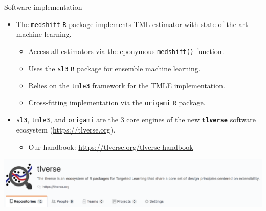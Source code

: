 \documentclass{beamer}
\begin{document}

\begin{frame}[c]{Software implementation}

\begin{center}
\begin{itemize}
  \itemsep2pt
  \item The \underline{\texttt{medshift} \texttt{R} package}
    \citep{hejazi2019medshift} implements TML estimator with state-of-the-art
    machine learning.
    \begin{itemize}
      \item Access all estimators via the eponymous \texttt{medshift()}
        function.
      \item Uses the \texttt{sl3} \texttt{R} package for ensemble machine
        learning.
      \item Relies on the \texttt{tmle3} framework for the TMLE implementation.
      \item Cross-fitting implementation via the \texttt{origami} \texttt{R}
        package.
    \end{itemize}
  \item \texttt{sl3}, \texttt{tmle3}, and \texttt{origami} are the 3 core
    engines of the new \textbf{\texttt{tlverse}} software ecosystem
    (\url{https://tlverse.org}).
    \begin{itemize}
      \item Our handbook: \url{https://tlverse.org/tlverse-handbook}
    \end{itemize}
\end{itemize}
\includegraphics[origin=c,scale=0.3]{tlverse}
\end{center}

\note{
}

\end{frame}


\setbeamercovered{}
\beamerdefaultoverlayspecification{}

\begin{frame}[c,allowframebreaks]{}

\scriptsize



\end{frame}
\end{document}
